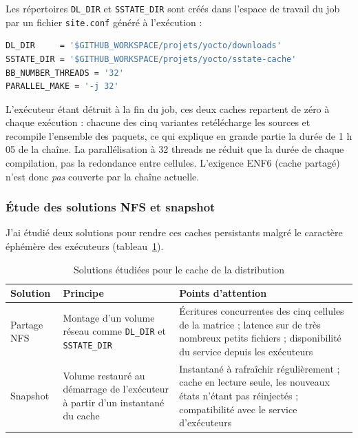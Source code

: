 Les répertoires \texttt{DL\_DIR} et \texttt{SSTATE\_DIR} sont créés dans
l'espace de travail du job par un fichier \texttt{site.conf} généré à
l'exécution :

\begin{lstlisting}[language=bash,caption={Configuration Yocto générée par le job},label={lst:impl-siteconf}]
DL_DIR     = '$GITHUB_WORKSPACE/projets/yocto/downloads'
SSTATE_DIR = '$GITHUB_WORKSPACE/projets/yocto/sstate-cache'
BB_NUMBER_THREADS = '32'
PARALLEL_MAKE = '-j 32'
\end{lstlisting}

L'exécuteur étant détruit à la fin du job, ces deux caches repartent de zéro à
chaque exécution : chacune des cinq variantes retélécharge les sources et
recompile l'ensemble des paquets, ce qui explique en grande partie la durée de
1 h 05 de la chaîne. La parallélisation à 32 threads ne réduit que la durée de
chaque compilation, pas la redondance entre cellules. L'exigence ENF6
(cache partagé) n'est donc \emph{pas} couverte par la chaîne actuelle.

\subsubsection{Étude des solutions NFS et snapshot}
\label{sssec:impl-etude-cache}

J'ai étudié deux solutions pour rendre ces caches persistants malgré le caractère
éphémère des exécuteurs (tableau~\ref{tab:impl-cache}).

\begin{table}[H]
\centering
\caption{Solutions étudiées pour le cache de la distribution}
\label{tab:impl-cache}
\small
\begin{tabularx}{\textwidth}{@{}p{2.6cm} X X@{}}
\toprule
\textbf{Solution} & \textbf{Principe} & \textbf{Points d'attention} \\
\midrule
Partage NFS &
  Montage d'un volume réseau comme \texttt{DL\_DIR} et \texttt{SSTATE\_DIR} &
  Écritures concurrentes des cinq cellules de la matrice ; latence sur de très
  nombreux petits fichiers ; disponibilité du service depuis les exécuteurs \\
Snapshot &
  Volume restauré au démarrage de l'exécuteur à partir d'un instantané du cache &
  Instantané à rafraîchir régulièrement ; cache en lecture seule, les nouveaux
  états n'étant pas réinjectés ; compatibilité avec le service d'exécuteurs \\
\bottomrule
\end{tabularx}
\end{table}

